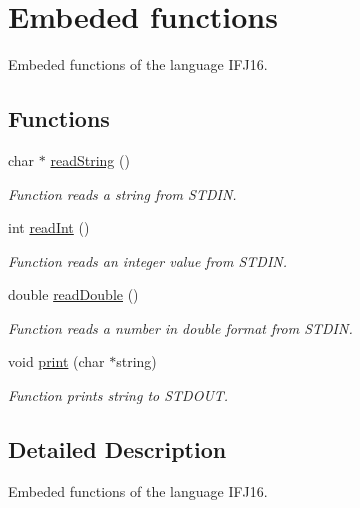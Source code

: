 \hypertarget{group__embedded__functions}{}\section{Embeded functions}
\label{group__embedded__functions}


Embeded functions of the language I\+F\+J16.  


\subsection*{Functions}
\begin{DoxyCompactItemize}
\item 
char $\ast$ \hyperlink{group__embedded__functions_gaaad595b5e15a2a16230783d586186f0c}{read\+String} ()
\begin{DoxyCompactList}\small\item\em Function reads a string from S\+T\+D\+I\+N. \end{DoxyCompactList}\item 
int \hyperlink{group__embedded__functions_gac4dc9964d286ddbbd2a108991190d39d}{read\+Int} ()
\begin{DoxyCompactList}\small\item\em Function reads an integer value from S\+T\+D\+I\+N. \end{DoxyCompactList}\item 
double \hyperlink{group__embedded__functions_ga840ea5c01770156bd51bdb9f65f44e30}{read\+Double} ()
\begin{DoxyCompactList}\small\item\em Function reads a number in double format from S\+T\+D\+I\+N. \end{DoxyCompactList}\item 
\hypertarget{group__embedded__functions_ga56f9aaf3081ee33dee941e011f177c61}{}void \hyperlink{group__embedded__functions_ga56f9aaf3081ee33dee941e011f177c61}{print} (char $\ast$string)\label{group__embedded__functions_ga56f9aaf3081ee33dee941e011f177c61}

\begin{DoxyCompactList}\small\item\em Function prints string to S\+T\+D\+O\+U\+T. \end{DoxyCompactList}\end{DoxyCompactItemize}


\subsection{Detailed Description}
Embeded functions of the language I\+F\+J16. 



